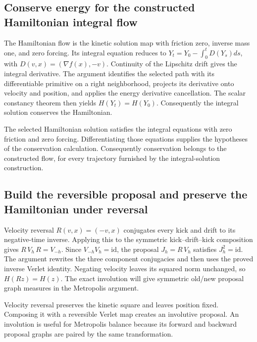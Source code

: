 \documentclass[11pt,a4paper]{report}
\begin{document}
\subsection{\texorpdfstring{Conserve energy for the constructed Hamiltonian integral flow}{Conserve energy for the constructed Hamiltonian integral flow}}
\label{report-step-KineticLangevin-Hamiltonian-lean-3}


The Hamiltonian flow is the kinetic solution map with friction zero, inverse mass one, and zero forcing. Its integral equation reduces to \(Y_t=Y_0-\int_0^tD(Y_s)ds\), with \(D(v,x)=(\nabla f(x),-v)\). Continuity of the Lipschitz drift gives the integral derivative. The argument identifies the selected path with its differentiable primitive on a right neighborhood, projects its derivative onto velocity and position, and applies the energy derivative cancellation. The scalar constancy theorem then yields \(H(Y_t)=H(Y_0)\). Consequently the integral solution conserves the Hamiltonian.



The selected Hamiltonian solution satisfies the integral equations with zero friction and zero forcing. Differentiating those equations supplies the hypotheses of the conservation calculation. Consequently conservation belongs to the constructed flow, for every trajectory furnished by the integral-solution construction.

\subsection{\texorpdfstring{Build the reversible proposal and preserve the Hamiltonian under reversal}{Build the reversible proposal and preserve the Hamiltonian under reversal}}
\label{report-step-KineticLangevin-Hamiltonian-lean-4}


Velocity reversal \(R(v,x)=(-v,x)\) conjugates every kick and drift to its negative-time inverse. Applying this to the symmetric kick–drift–kick composition gives \(R\,V_h\,R=V_{-h}\). Since \(V_{-h}V_h=\mathrm{id}\), the proposal \(J_h=R\,V_h\) satisfies \(J_h^2=\mathrm{id}\). The argument rewrites the three component conjugacies and then uses the proved inverse Verlet identity. Negating velocity leaves its squared norm unchanged, so \(H(Rz)=H(z)\). The exact involution will give symmetric old/\allowbreak{}new proposal graph measures in the Metropolis argument.



Velocity reversal preserves the kinetic square and leaves position fixed. Composing it with a reversible Verlet map creates an involutive proposal. An involution is useful for Metropolis balance because its forward and backward proposal graphs are paired by the same transformation.
\end{document}
